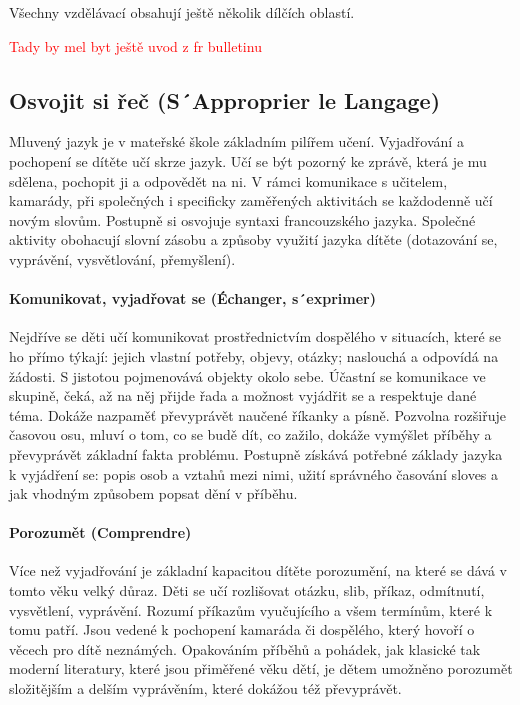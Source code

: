 	Všechny vzdělávací obsahují ještě několik dílčích oblastí.

	\textcolor{red}{Tady by mel byt ještě uvod z fr bulletinu}

	\subsection{Osvojit si řeč (S´Approprier le Langage)}
		Mluvený jazyk je v mateřské škole základním pilířem učení. Vyjadřování a pochopení se dítěte učí skrze jazyk. Učí se být pozorný ke zprávě, která je mu sdělena, pochopit ji a odpovědět na ni. V rámci komunikace s učitelem, kamarády, při společných i specificky zaměřených aktivitách se každodenně učí novým slovům. Postupně si osvojuje syntaxi francouzského jazyka.  Společné aktivity obohacují slovní zásobu a způsoby využití jazyka dítěte (dotazování se, vyprávění, vysvětlování, přemyšlení).

		\paragraph{Komunikovat, vyjadřovat se (Échanger, s´exprimer)}
		Nejdříve se děti učí komunikovat prostřednictvím dospělého v situacích, které se ho přímo týkají: jejich vlastní potřeby, objevy, otázky; naslouchá a odpovídá na žádosti. S jistotou pojmenovává objekty okolo sebe. Účastní se komunikace ve skupině, čeká, až na něj přijde řada a možnost vyjádřit se a respektuje dané téma. Dokáže nazpaměť převyprávět naučené říkanky a písně. Pozvolna rozšiřuje časovou osu, mluví o tom, co se budě dít, co zažilo, dokáže vymýšlet příběhy a převyprávět základní fakta problému. Postupně získává potřebné základy jazyka k vyjádření se: popis osob a vztahů mezi nimi, užití správného časování sloves a jak vhodným způsobem popsat dění v příběhu.

		\paragraph{Porozumět (Comprendre)}
		Více než vyjadřování je základní kapacitou dítěte porozumění, na které se dává v tomto věku velký důraz.
		Děti se učí rozlišovat otázku, slib, příkaz, odmítnutí, vysvětlení, vyprávění. Rozumí příkazům vyučujícího a všem termínům, které k tomu patří. Jsou vedené k pochopení kamaráda či dospělého, který hovoří o věcech pro dítě neznámých. Opakováním příběhů a pohádek, jak klasické tak moderní literatury, které jsou přiměřené věku dětí, je dětem umožněno porozumět složitějším a delším vyprávěním, které dokážou též převyprávět. 

